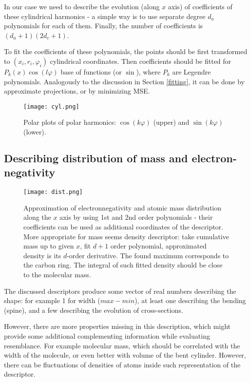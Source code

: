 \documentclass[10pt,journal]{IEEEtranTCOM}
\theoremstyle{plain}
\begin{document}
In our case we need to describe the evolution (along $x$ axis) of coefficients of these cylindrical harmonics - a simple way is to use separate degree $d_a$ polynomials for each of them. Finally, the number of coefficients is $(d_a+1)(2d_c+1)$.

To fit the coefficients of these polynomials, the points should be first transformed to $(x_i, r_i, \varphi_i)$ cylindrical coordinates. Then coefficients should be fitted for $P_k(x) \cos(l\varphi)$ base of functions (or $\sin$), where $P_k$ are Legendre polynomials. Analogously to the discussion in Section \ref{fitting}, it can be done by approximate projections, or by minimizing MSE.

\begin{figure}[t!]
    \centering
        \texttt{[image: cyl.png]}
        \caption{Polar plots of polar harmonics: $\cos(k\varphi)$ (upper) and $\sin(k\varphi)$ (lower).}
        \label{cyl}
\end{figure}
\subsection{Describing distribution of mass and electron-negativity}
\begin{figure}[t!]
    \centering
        \texttt{[image: dist.png]}
        \caption{Approximation of electronnegativity and atomic mass distribution along the $x$ axis by using 1st and 2nd order polynomials - their coefficients can be used as additional coordinates of the descriptor. More appropriate for mass seems density descriptor: take cumulative mass up to given $x$, fit $d+1$ order polynomial, approximated density is its $d$-order derivative. The found maximum corresponds to the carbon ring. The integral of such fitted density should be close to the molecular mass.}
        \label{dist}
\end{figure}
The discussed descriptors produce some vector of real numbers describing the shape: for example 1 for width ($max-min$), at least one describing the bending (spine), and a few describing the evolution of cross-sections.

However, there are more properties missing in this description, which might provide some additional complementing information while evaluating resemblance. For example molecular mass, which should be correlated with the width of the molecule, or even better with volume of the bent cylinder. However, there can be fluctuations of densities of atoms inside such representation of the descriptor.
\end{document}
